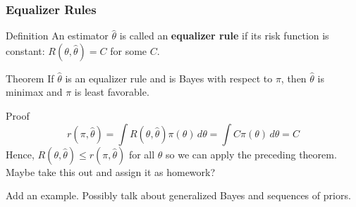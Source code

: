 \begin{frame}
  \frametitle{Equalizer Rules}
  \begin{block}{Definition}
    An estimator $\widehat{\theta}$ is called an \textbf{equalizer rule} if its risk function is constant: $R(\theta, \widehat{\theta}) = C$ for some $C$.
  \end{block}

  \begin{block}{Theorem}
    If $\widehat{\theta}$ is an equalizer rule and is Bayes with respect to $\pi$, then $\widehat{\theta}$ is minimax and $\pi$ is least favorable.
  \end{block}
  
  \begin{block}{Proof}
    \vspace{-2em}
    \[
      r(\pi, \widehat{\theta}) = \int R(\theta, \widehat{\theta})\pi(\theta)\, d\theta = \int C \pi(\theta) \, d\theta = C 
    \]
    Hence, $R(\theta, \widehat{\theta}) \leq r(\pi, \widehat{\theta})$ for all $\theta$ so we can apply the preceding theorem. \alert{Maybe take this out and assign it as homework?}
  \end{block}

\end{frame}
\begin{frame}
  Add an example. Possibly talk about generalized Bayes and sequences of priors.
\end{frame}
